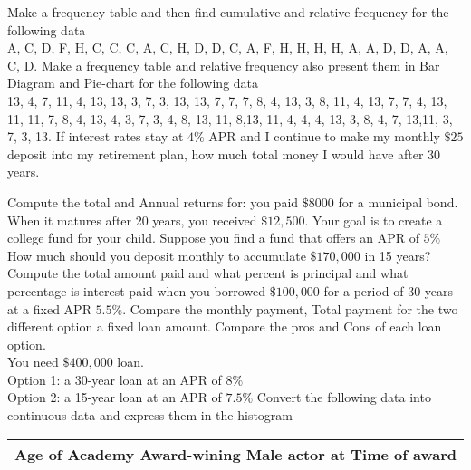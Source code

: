 \documentclass[11pt]{exam}
\begin{document}
\begin{questions}
\newpage
\addpoints
\question[6] Make a frequency table and then find cumulative  and relative frequency for the following data\\
A, C, D, F, H, C, C, C, A, C, H, D, D, C, A, F, H, H, H, H, A, A, D, D, A, A, C, D. 
\vspace{10cm}
\addpoints
\question[15] Make a frequency table and relative frequency also present them in  Bar Diagram and Pie-chart for the following data\\
13, 4, 7, 11, 4, 13, 13, 3, 7, 3, 13, 13, 7, 7, 7, 8, 4, 13, 3, 8, 11, 4, 13, 7, 7, 4, 13, 11, 11, 7, 8, 4, 13, 4, 3, 7, 3, 4, 8, 13, 11, 8,13, 11, 4, 4, 4, 13, 3, 8, 4, 7, 13,11, 3, 7, 3, 13. 
\vspace{10cm}
\question[6] If interest rates stay at $4\%$ APR and I continue to make my monthly $\$25$ deposit into my retirement plan, how much total money I would have after 30 years. 
\vspace{10cm}

\question[8] Compute the total and Annual returns for: you paid $\$8000$ for a municipal bond. When it matures after 20 years, you received $\$12,500$.  
\vspace{10cm}
\question[6] Your goal is to create a college fund for your child. Suppose you find a fund that offers an APR of $5\%$ How much should you deposit monthly to accumulate $\$170,000$ in 15 years? 
\vspace{10cm}
\question[10] Compute the total amount paid and what percent is principal and what percentage is interest paid when you borrowed $\$100,000$ for a period of 30 years at a fixed APR $5.5\%$.  
\vspace{10cm}
\question[15] Compare the monthly payment, Total payment for the two different option a fixed loan amount. Compare the pros and Cons of each loan option.\\
You need $\$400,000$ loan. \\
Option 1: a 30-year loan at an APR of $8\%$\\
Option 2: a 15-year loan at an APR of $7.5\%$ 
\newpage
\question [10] Convert the following data into continuous data and express them in the histogram \begin{table}[h]                           
	\centering
	\begin{tabular}{|c|c|}
		\hline
		\multicolumn{2}{c|}{\textbf{Age of Academy Award-wining Male actor at Time of award}} \\ \hline
		

\end{tabular}
\end{table}
\end{questions}
\end{document}
